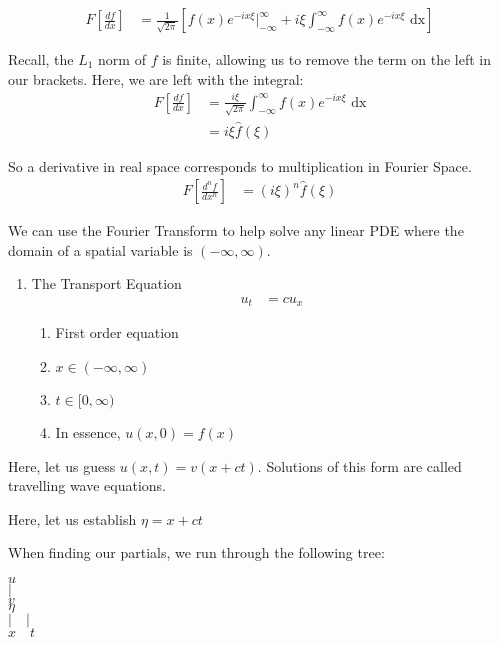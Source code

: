 \begin{align}
  F\left[\frac{df}{dx}\right] & = \frac{1}{\sqrt{2 \pi}}
  \left[
  f(x) e^{-i x \xi}\Big|^\infty_{-\infty} + i \xi \int^\infty_{-\infty} f(x) e^{- i x \xi} \text{ dx}
  \right]
\end{align}

Recall, the $L_1$ norm of $f$ is finite, allowing us to remove the term on the left in our brackets. Here, we are left with the integral:
%
\begin{align}
  F\left[\frac{df}{dx}\right] & = \frac{i \xi}{\sqrt{2 \pi}} \int^\infty_{-\infty} f(x) e^{-i x \xi} \text{ dx}\\
  & = i \xi \hat f(\xi)
\end{align}

So a derivative in real space corresponds to multiplication in Fourier Space.
%
\begin{align}
  F\left[ \frac{d^nf}{dx^n} \right] & = (i \xi)^n \hat f(\xi)
\end{align}

We can use the Fourier Transform to help solve any linear PDE where the domain of a spatial variable is $(-\infty, \infty)$.
\bigbreak
{}
\begin{enumerate}
  \item The Transport Equation
  \begin{align}
    u_t & = cu_x
  \end{align}
  \begin{enumerate}
    \item First order equation
    \item $x \in (-\infty, \infty)$
    \item $t \in [0, \infty)$
    \item In essence, $u(x, 0) = f(x)$
  \end{enumerate}
\end{enumerate}
  \bigbreak

  Here, let us guess $u(x, t) = v(x + ct)$. Solutions of this form are called travelling wave equations.

  Here, let us establish $\eta = x + ct$

  When finding our partials, we run through the following tree:

  \begin{center}
    $u$\\
    $|$\\
    $v$\\
    $\eta$\\
    $| \quad |$\\
    $x \quad t$
  \end{center}

